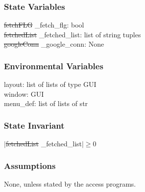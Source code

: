 \documentclass[12pt, titlepage]{article}
\begin{document}
\subsubsection{State Variables}
\sout{fetchFLG} \color{blue}\_fetch\_flg\color{black}: bool\\
\sout{fetchedList} \color{blue}\_fetched\_list\color{black}: list of string tuples\\
\sout{googleConn} \color{blue}\_google\_conn\color{black}: None
\subsubsection{Environmental Variables}
layout: list of lists of type GUI\\
window: GUI\\
menu\_def: list of lists of str
\subsubsection{State Invariant}
$|$\sout{fetchedList} \color{blue}\_fetched\_list\color{black}$| \ge 0$
\subsubsection{Assumptions}
None, unless stated by the access programs.
\end{document}
